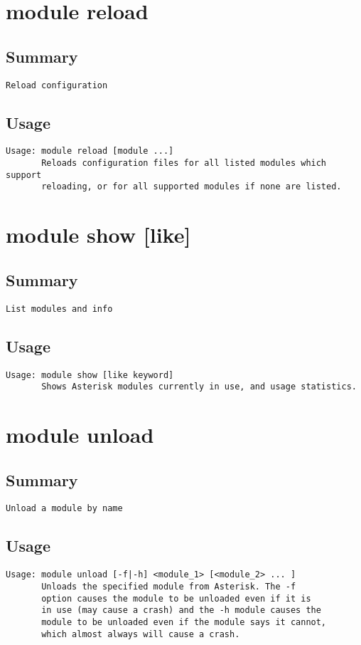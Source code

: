 \section{module reload}
\subsection{Summary}
\begin{verbatim}
Reload configuration
\end{verbatim}
\subsection{Usage}
\begin{verbatim}
Usage: module reload [module ...]
       Reloads configuration files for all listed modules which support
       reloading, or for all supported modules if none are listed.

\end{verbatim}


\section{module show [like]}
\subsection{Summary}
\begin{verbatim}
List modules and info
\end{verbatim}
\subsection{Usage}
\begin{verbatim}
Usage: module show [like keyword]
       Shows Asterisk modules currently in use, and usage statistics.

\end{verbatim}


\section{module unload}
\subsection{Summary}
\begin{verbatim}
Unload a module by name
\end{verbatim}
\subsection{Usage}
\begin{verbatim}
Usage: module unload [-f|-h] <module_1> [<module_2> ... ]
       Unloads the specified module from Asterisk. The -f
       option causes the module to be unloaded even if it is
       in use (may cause a crash) and the -h module causes the
       module to be unloaded even if the module says it cannot, 
       which almost always will cause a crash.

\end{verbatim}


